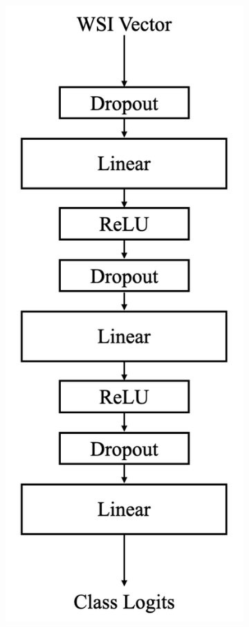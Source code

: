 \documentclass{l4proj}
\begin{document}
\begin{figure}[]
\begin{subfigure}[b]{0.3\textwidth}
        \includegraphics[width=\textwidth]{images/dropoutclassifier.png}

\end{subfigure}
\end{figure}
\end{document}
